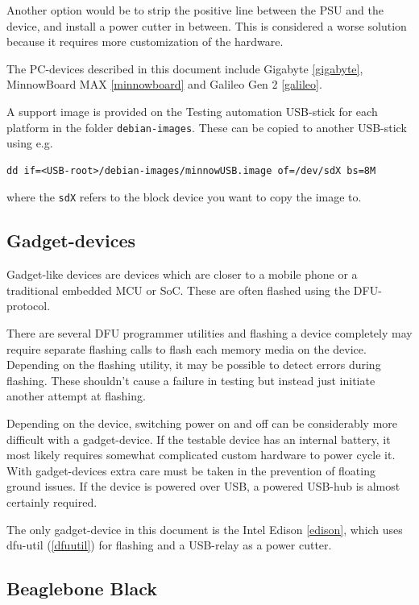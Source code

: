 \documentclass[a4paper,11pt]{article}
\newcommand{\cmd}[1]{\texttt{#1}}
\begin{document}
Another option would be to strip the positive line between the PSU and the device, and install a power cutter in between. This is considered a worse solution because it requires more customization of the hardware.

The PC-devices described in this document include Gigabyte \ref{gigabyte}, MinnowBoard MAX \ref{minnowboard} and Galileo Gen 2 \ref{galileo}. 

A support image is provided on the Testing automation USB-stick for each platform in the folder \cmd{debian-images}. These can be copied to another USB-stick using e.g.
\begin{lstlisting}
dd if=<USB-root>/debian-images/minnowUSB.image of=/dev/sdX bs=8M
\end{lstlisting}
where the \cmd{sdX} refers to the block device you want to copy the image to.

\subsection{Gadget-devices}

Gadget-like devices are devices which are closer to a mobile phone or a traditional embedded MCU or SoC. These are often flashed using the DFU-protocol.

There are several DFU programmer utilities and flashing a device completely may require separate flashing calls to flash each memory media on the device. Depending on the flashing utility, it may be possible to detect errors during flashing. These shouldn't cause a failure in testing but instead just initiate another attempt at flashing.

Depending on the device, switching power on and off can be considerably more difficult with a gadget-device. If the testable device has an internal battery, it most likely requires somewhat complicated custom hardware to power cycle it. With gadget-devices extra care must be taken in the prevention of floating ground issues. If the device is powered over USB, a powered USB-hub is almost certainly required.

The only gadget-device in this document is the Intel Edison \ref{edison}, which uses dfu-util (\ref{dfuutil}) for flashing and a USB-relay as a power cutter.

\subsection{Beaglebone Black}
\label{bbb}
\end{document}
